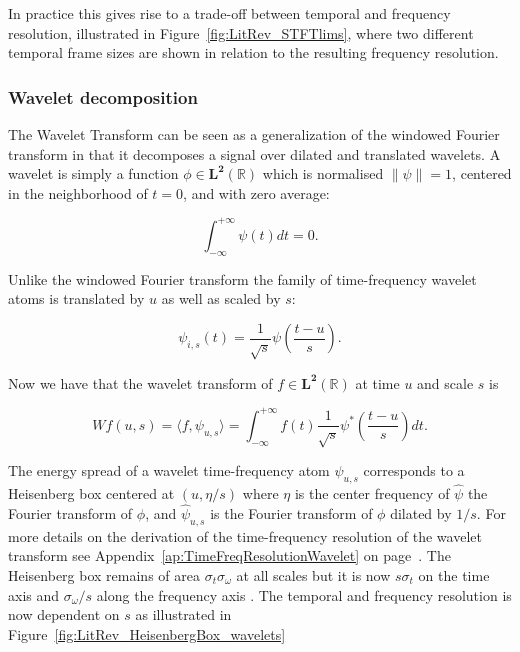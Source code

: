 In practice this gives rise to a trade-off between temporal and frequency resolution, illustrated in Figure~\ref{fig:LitRev_STFTlims}, where two different temporal frame sizes are shown in relation to the resulting frequency resolution.

\subsubsection{Wavelet decomposition}
The Wavelet Transform can be seen as a generalization of the windowed Fourier transform in that it decomposes a signal over dilated and translated wavelets. A wavelet is simply a function $\phi \in \mathbf{L^2}(\mathbb{R})$ which is normalised $\| \psi \| = 1$, centered in the neighborhood of $t=0$, and with zero average:

\begin{equation}\label{eq:Mallat1999_4}
\int^{+\infty}_{-\infty} \psi(t) dt = 0.
\end{equation}

Unlike the windowed Fourier transform the family of time-frequency wavelet atoms is translated by $u$ as well as scaled by $s$:

\begin{equation}\label{eq:Mallat1999_5}
\psi_{i,s}(t) = \frac{1}{\sqrt{s}}\psi\left(\frac{t-u}{s}\right).
\end{equation}

Now we have that the wavelet transform of $f \in \mathbf{L^2}(\mathbb{R})$ at time $u$ and scale $s$ is

\begin{equation}\label{eq:Mallat1999_x}
W f(u,s) = \langle f, \psi_{u,s} \rangle = \int^{+\infty}_{-\infty} f(t) \frac{1}{\sqrt{s}}\psi^\ast \left( \frac{t-u}{s} \right) dt.
\end{equation}

The energy spread of a wavelet time-frequency atom $\psi_{u,s}$ corresponds to a Heisenberg box centered at $(u,\eta/s)$ where $\eta$ is the center frequency of $\hat{\psi}$ the Fourier transform of $\phi$, and $\hat{\psi}_{u,s}$ is the Fourier transform of $\phi$ dilated by $1/s$. For more details on the derivation of the time-frequency resolution of the wavelet transform see Appendix~\ref{ap:TimeFreqResolutionWavelet} on page~\pageref{ap:TimeFreqResolutionWavelet}. The Heisenberg box remains of area $\sigma_t \sigma_\omega$ at all scales but it is now $s\sigma_t$ on the time axis and $\sigma_\omega /s$ along the frequency axis \cite{Mallat1999}. The temporal and frequency resolution is now dependent on $s$ as illustrated in Figure~\ref{fig:LitRev_HeisenbergBox_wavelets}

